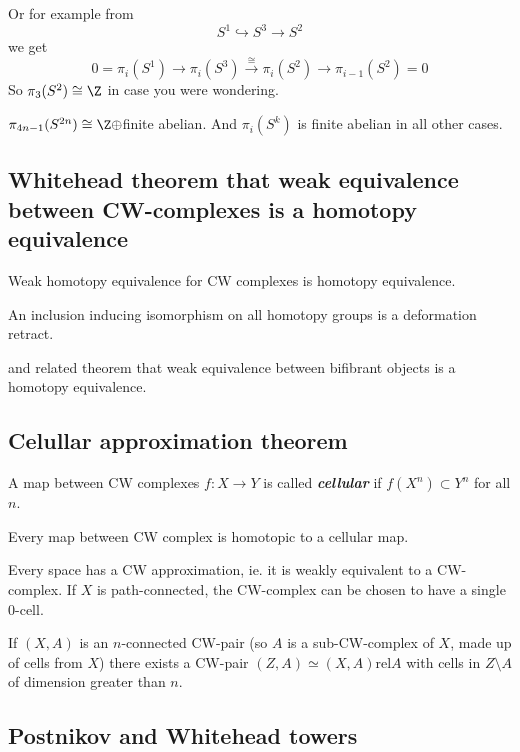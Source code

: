 \begin{remark}
Or for example from
$$S^1\hookrightarrow S^3\to S^2$$
we get
$$0=\pi_i(S^1)\to \pi_i(S^3)\overset{\cong}{\to}\pi_i(S^2)\to\pi_{i-1}(S^2)=0$$
So $\pi_3(S^2)\cong\Z$ in case you were wondering.
\begin{claim}[Serre]
	$\pi_{4n-1}(S^{2n})\cong\Z\oplus$finite abelian. And $\pi_i(S^k)$ is finite abelian in all other cases.
\end{claim}

\subsection{Whitehead theorem that weak equivalence between CW-complexes is a homotopy equivalence}

\begin{thm}[Whitehead]
	Weak homotopy equivalence for CW complexes is homotopy equivalence.

	An inclusion inducing isomorphism on all homotopy groups is a deformation retract.
\end{thm}


and related theorem that weak equivalence between bifibrant objects is a homotopy equivalence.
\subsection{Celullar approximation theorem}

\begin{definition}
	A map between CW complexes $f:X\to Y$ is called \textit{\textbf{cellular}} if $f(X^{n})\subset Y^{n}$ for all $n$.
\end{definition}
\begin{thm}
	Every map between CW complex is homotopic to a cellular map.
\end{thm}
\begin{thm}[CW approximation]
	Every space has a CW approximation, ie. it is weakly equivalent to a CW-complex.	
	If $X$ is path-connected, the CW-complex can be chosen to have a single 0-cell.

	If $(X,A)$ is an $n$-connected CW-pair (so $A$ is a sub-CW-complex of $X$, made up of cells from $X$) there exists a CW-pair $(Z,A)\simeq (X,A)\text{rel}A$ with cells in $Z\setminus A$ of dimension greater than $n$.
\end{thm}

\subsection{Postnikov and Whitehead towers}


\end{remark}
